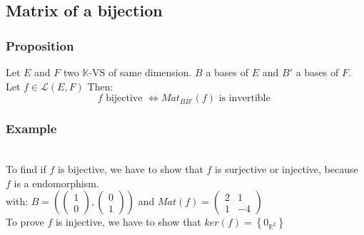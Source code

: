 \documentclass[notitlepage]{math}
\begin{document}
\subsection{Matrix of a bijection}
\subsubsection{Proposition}
Let $E$ and $F$ two $\mathbb{K}$-VS of same dimension. $B$ a bases of $E$ and $B'$ a bases of $F$. Let $f \in \mathcal{L}(E,F)$ Then:
\[ f \text{ bijective } \Longleftrightarrow Mat_{BB'}(f) \text{ is invertible }\]
\subsubsection{Example}
\\
To find if $f$ is bijective, we have to show that $f$ is surjective or injective, because $f$ is a endomorphism. \\
with: $B = \left(\begin{pmatrix} 1 \\ 0 \end{pmatrix}, \begin{pmatrix} 0 \\ 1 \end{pmatrix}\right)$ 
and $Mat(f) = \begin{pmatrix} 2 & 1 \\
        1 & -4
    \end{pmatrix}$ \\
To prove $f$ is injective, we have to show that $ker (f) = \left\{ 0_{\mathbb{R}^2} \right\}$
\end{document}
